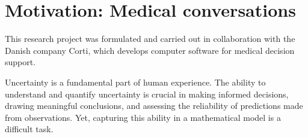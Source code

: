 \section{Motivation: Medical conversations}

This research project was formulated and carried out in collaboration with the Danish company Corti, which develops computer software for medical decision support. 




























\iffalse


Uncertainty is a fundamental part of human experience. The ability to understand and quantify uncertainty is crucial in making informed decisions, drawing meaningful conclusions, and assessing the reliability of predictions made from observations. Yet, capturing this ability in a mathematical model is a difficult task. 

